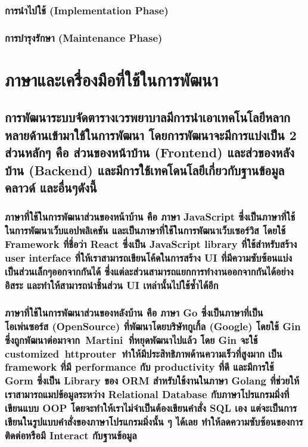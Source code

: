 \subsubsection{การนำไปใช้ (Implementation Phase)}

\subsubsection{การบำรุงรักษา (Maintenance Phase)}


\clearpage

\section{ภาษาและเครื่องมือที่ใช้ในการพัฒนา}

\vspace{0.25cm}

\hspace{0cm}\subsection{การพัฒนาระบบจัดตารางเวรพยาบาลมีการนำเอาเทคโนโลยีหลากหลายด้านเข้ามาใช้ในการพัฒนา โดยการพัฒนาจะมีการแบ่งเป็น 2 ส่วนหลักๆ คือ ส่วนของหน้าบ้าน (Frontend) และส่วของหลังบ้าน (Backend) และมีการใช้เทคโดนโลยีเกี่ยวกับฐานข้อมูล คลาวด์ และอื่นๆดังนี้}

\hspace{0cm}\subsubsection{ภาษาที่ใช้ในการพัฒนาส่วนของหน้าบ้าน คือ ภาษา JavaScript ซึ่งเป็นภาษาที่ใช้ในการพัฒนาเว็บแอปพลิเคชัน และเป็นภาษาที่ใช้ในการพัฒนาเว็บเซอร์วิส โดยใช้ Framework ที่ชื่อว่า React ซึ่งเป็น JavaScript library ที่ใช้สำหรับสร้าง user interface ที่ให้เราสามารถเขียนโค้ดในการสร้าง UI ที่มีความซับซ้อนแบ่งเป็นส่วนเล็กๆออกจากกันได้ ซึ่งแต่ละส่วนสามารถแยกการทำงานออกจากกันได้อย่างอิสระ และทำให้สามารถนำชิ้นส่วน UI เหล่านั้นไปใช้ซ้ำได้อีก} \cite{React}

\hspace{0cm}\subsubsection{ภาษาที่ใช้ในการพัฒนาส่วนของหลังบ้าน คือ ภาษา Go ซึ่งเป็นภาษาที่เป็นโอเพ่นซอร์ส (OpenSource) ที่พัฒนาโดยบริษัทกูเกิ้ล (Google) \cite{Go} โดยใช้ Gin ซึ่งถูกพัฒนาต่อมาจาก Martini ที่หยุดพัฒนาไปแล้ว โดย Gin จะใช้ customized httprouter ทำให้มีประสิทธิภาพด้านความเร็วที่สูงมาก เป็น framework ที่มี performance กับ productivity ที่ดี \cite{Gin} และมีการใช้ Gorm ซึ่งเป็น Library ของ ORM สำหรับใช้งานในภาษา Golang ที่ช่วยให้เราสามารถแมปข้อมูลระหว่าง Relational Database กับภาษาโปรแกรมมิ่งที่เขียนแบบ OOP โดยจะทำให้เราไม่จำเป็นต้องเขียนคำสั่ง SQL เอง แต่จะเป็นการเขียนในรูปแบบคำสั่งของภาษาโปรแกรมมิ่งนั้น ๆ ได้เลย ทำให้ลดความซับซ้อนของการติดต่อหรือมี Interact กับฐานข้อมูล \cite{Gorm}} 

